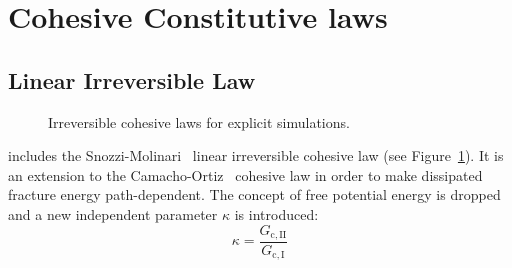 \section{Cohesive Constitutive laws}
\label{sec:cohesive-laws}

\subsection{Linear Irreversible Law}

\begin{figure}[!hbt]
  \centering
  \qquad
  \caption{Irreversible cohesive laws for explicit simulations.}
  \label{fig:smm:coh:linear_cohesive_law}
\end{figure}

\akantu includes the Snozzi-Molinari~\cite{snozzi_cohesive_2013}
linear irreversible cohesive law (see
Figure~\ref{fig:smm:coh:linear_cohesive_law}). It is an extension to
the Camacho-Ortiz~\cite{camacho_computational_1996} cohesive law in
order to make dissipated fracture energy path-dependent. The concept
of free potential energy is dropped and a new independent parameter
$\kappa$ is introduced:
\begin{equation}
  \kappa = \frac{G_\mathrm{c, II}}{G_\mathrm{c, I}}
\end{equation}

